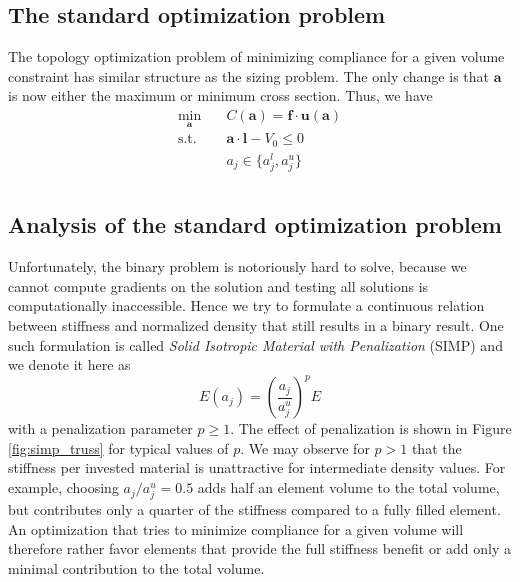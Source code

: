 \subsection{The standard optimization problem}
The topology optimization problem of minimizing compliance for a given volume constraint has similar structure as the sizing problem. The only change is that $\mathbf{a}$ is now either the maximum or minimum cross section. Thus, we have 
\begin{equation}
    \begin{aligned}
        \min_{\mathbf{a}} \quad & C(\mathbf{a}) = \mathbf{f} \cdot \mathbf{u}(\mathbf{a})\\
        \textrm{s.t.} \quad & \mathbf{a} \cdot \mathbf{l} - V_0 \le 0  \\
                            & a_j \in \{a_j^l, a_j^u\}\\
    \end{aligned}
    \label{eq:truss_topology_optimization}
\end{equation}

\subsection{Analysis of the standard optimization problem}
Unfortunately, the binary problem is notoriously hard to solve, because we cannot compute gradients on the solution and testing all solutions is computationally inaccessible. Hence we try to formulate a continuous relation between stiffness and normalized density that still results in a binary result. One such formulation is called \emph{Solid Isotropic Material with Penalization} (SIMP) and we denote it here as 
\begin{equation}
    E(a_j)= \left(\frac{a_j}{a_j^u}\right)^p E
\end{equation}
with a penalization parameter $p \ge 1$. 
The effect of penalization is shown in Figure \ref{fig:simp_truss} for typical values of $p$. We may observe for $p>1$ that the stiffness per invested material is unattractive for intermediate density values. For example, choosing $a_j/a_j^u=0.5$ adds half an element volume to the total volume, but contributes only a quarter of the stiffness compared to a fully filled element. An optimization that tries to minimize compliance for a given volume will therefore rather favor elements that provide the full stiffness benefit or add only a minimal contribution to the total volume.

